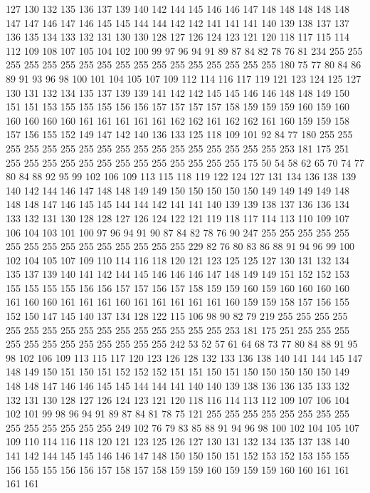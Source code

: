 127 130 132 135 136 137 139 140 142 144 145 146 146 147 148 148 148 148 148 147
147 146 147 146 145 145 144 144 142 142 141 141 141 140 139 138 137 137 136 135
134 133 132 131 130 130 128 127 126 124 123 121 120 118 117 115 114 112 109 108
107 105 104 102 100 99 97 96 94 91 89 87 84 82 78 76 81 234 255 255
255 255 255 255 255 255 255 255 255 255 255 255 255 255 255 180 75 77 80 84
86 89 91 93 96 98 100 101 104 105 107 109 112 114 116 117 119 121 123 124
125 127 130 131 132 134 135 137 139 139 141 142 142 145 145 146 146 148 148 149
150 151 151 153 155 155 155 156 156 157 157 157 157 158 159 159 159 160 159 160
160 160 160 160 161 161 161 161 161 162 162 161 162 162 161 160 159 159 158 157
156 155 152 149 147 142 140 136 133 125 118 109 101 92 84 77 180 255 255 255
255 255 255 255 255 255 255 255 255 255 255 255 255 255 253 181 175 251 255 255
255 255 255 255 255 255 255 255 255 255 255 175 50 54 58 62 65 70 74 77
80 84 88 92 95 99 102 106 109 113 115 118 119 122 124 127 131 134 136 138
139 140 142 144 146 147 148 148 149 149 150 150 150 150 150 149 149 149 149 148
148 148 147 146 145 145 144 144 142 141 141 140 139 139 138 137 136 136 134 133
132 131 130 128 128 127 126 124 122 121 119 118 117 114 113 110 109 107 106 104
103 101 100 97 96 94 91 90 87 84 82 78 76 90 247 255 255 255 255 255
255 255 255 255 255 255 255 255 255 255 229 82 76 80 83 86 88 91 94 96
99 100 102 104 105 107 109 110 114 116 118 120 121 123 125 125 127 130 131 132
134 135 137 139 140 141 142 144 145 146 146 146 147 148 149 149 151 152 152 153
155 155 155 155 156 156 157 157 156 157 158 159 159 160 159 160 160 160 160 161
160 160 161 161 161 160 161 161 161 161 161 160 159 159 158 157 156 155 152 150
147 145 140 137 134 128 122 115 106 98 90 82 79 219 255 255 255 255 255 255
255 255 255 255 255 255 255 255 255 255 253 181 175 251 255 255 255 255 255 255
255 255 255 255 255 255 242 53 52 57 61 64 68 73 77 80 84 88 91 95
98 102 106 109 113 115 117 120 123 126 128 132 133 136 138 140 141 144 145 147
148 149 150 151 150 151 152 152 152 151 151 150 151 150 150 150 150 150 149 148
148 147 146 146 145 145 144 144 141 140 140 139 138 136 136 135 133 132 132 131
130 128 127 126 124 123 121 120 118 116 114 113 112 109 107 106 104 102 101 99
98 96 94 91 89 87 84 81 78 75 121 255 255 255 255 255 255 255 255 255
255 255 255 255 255 249 102 76 79 83 85 88 91 94 96 98 100 102 104 105
107 109 110 114 116 118 120 121 123 125 126 127 130 131 132 134 135 137 138 140
141 142 144 145 145 146 146 147 148 150 150 150 151 152 153 152 153 155 155 156
155 155 156 156 157 158 157 158 159 159 160 159 159 159 160 160 161 161 161 161

